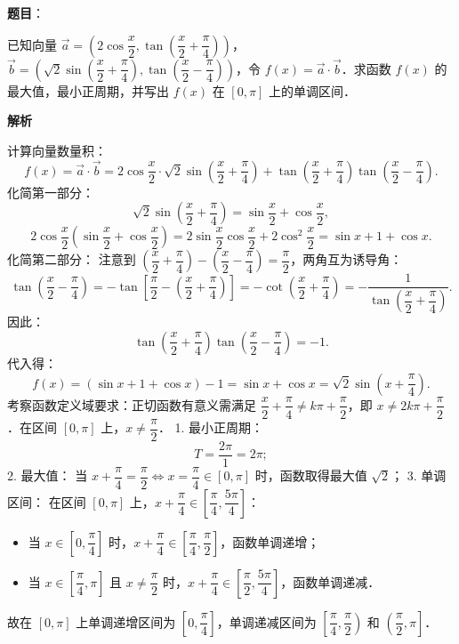 \begin{answer}

\textbf{题目}：

已知向量 $\vec{a} = \left(2\cos\dfrac{x}{2}, \tan\left(\dfrac{x}{2} + \dfrac{\pi}{4}\right)\right)$，$\vec{b} = \left(\sqrt{2}\sin\left(\dfrac{x}{2} + \dfrac{\pi}{4}\right), \tan\left(\dfrac{x}{2} - \dfrac{\pi}{4}\right)\right)$，令 $f(x) = \vec{a} \cdot \vec{b}$．求函数 $f(x)$ 的最大值，最小正周期，并写出 $f(x)$ 在 $[0, \pi]$ 上的单调区间．

\textbf{解析}

计算向量数量积：
\nopagebreak[4]
\[
f(x) = \vec{a} \cdot \vec{b} = 2\cos\dfrac{x}{2} \cdot \sqrt{2}\sin\left(\dfrac{x}{2} + \dfrac{\pi}{4}\right) + \tan\left(\dfrac{x}{2} + \dfrac{\pi}{4}\right)\tan\left(\dfrac{x}{2} - \dfrac{\pi}{4}\right).
\]
化简第一部分：
\nopagebreak[4]
\[
\sqrt{2}\sin\left(\dfrac{x}{2} + \dfrac{\pi}{4}\right) = \sin\dfrac{x}{2} + \cos\dfrac{x}{2},
\]
\nopagebreak[4]
\[
2\cos\dfrac{x}{2}\left(\sin\dfrac{x}{2} + \cos\dfrac{x}{2}\right) = 2\sin\dfrac{x}{2}\cos\dfrac{x}{2} + 2\cos^2\dfrac{x}{2} = \sin x + 1 + \cos x.
\]
化简第二部分：
注意到 $\left(\dfrac{x}{2} + \dfrac{\pi}{4}\right) - \left(\dfrac{x}{2} - \dfrac{\pi}{4}\right) = \dfrac{\pi}{2}$，两角互为诱导角：
\nopagebreak[4]
\[
\tan\left(\dfrac{x}{2} - \dfrac{\pi}{4}\right) = -\tan\left[\dfrac{\pi}{2} - \left(\dfrac{x}{2} + \dfrac{\pi}{4}\right)\right] = -\cot\left(\dfrac{x}{2} + \dfrac{\pi}{4}\right) = -\dfrac{1}{\tan\left(\dfrac{x}{2} + \dfrac{\pi}{4}\right)}.
\]
因此：
\nopagebreak[4]
\[
\tan\left(\dfrac{x}{2} + \dfrac{\pi}{4}\right)\tan\left(\dfrac{x}{2} - \dfrac{\pi}{4}\right) = -1.
\]
代入得：
\nopagebreak[4]
\[
f(x) = (\sin x + 1 + \cos x) - 1 = \sin x + \cos x = \sqrt{2}\sin\left(x + \dfrac{\pi}{4}\right).
\]
考察函数定义域要求：正切函数有意义需满足 $\dfrac{x}{2} + \dfrac{\pi}{4} \neq k\pi + \dfrac{\pi}{2}$，即 $x \neq 2k\pi + \dfrac{\pi}{2}$．在区间 $[0, \pi]$ 上，$x \neq \dfrac{\pi}{2}$．
1. 最小正周期：
\nopagebreak[4]
\[
T = \dfrac{2\pi}{1} = 2\pi;
\]
2. 最大值：
当 $x + \dfrac{\pi}{4} = \dfrac{\pi}{2} \iff x = \dfrac{\pi}{4} \in [0, \pi]$ 时，函数取得最大值 $\sqrt{2}$；
3. 单调区间：
在区间 $[0, \pi]$ 上，$x + \dfrac{\pi}{4} \in \left[\dfrac{\pi}{4}, \dfrac{5\pi}{4}\right]$：
\begin{itemize}
\item 当 $x \in \left[0, \dfrac{\pi}{4}\right]$ 时，$x + \dfrac{\pi}{4} \in \left[\dfrac{\pi}{4}, \dfrac{\pi}{2}\right]$，函数单调递增；
\item 当 $x \in \left[\dfrac{\pi}{4}, \pi\right]$ 且 $x \neq \dfrac{\pi}{2}$ 时，$x + \dfrac{\pi}{4} \in \left[\dfrac{\pi}{2}, \dfrac{5\pi}{4}\right]$，函数单调递减．
\end{itemize}
故在 $[0, \pi]$ 上单调递增区间为 $\left[0, \dfrac{\pi}{4}\right]$，单调递减区间为 $\left[\dfrac{\pi}{4}, \dfrac{\pi}{2}\right)$ 和 $\left(\dfrac{\pi}{2}, \pi\right]$．


\end{answer}
